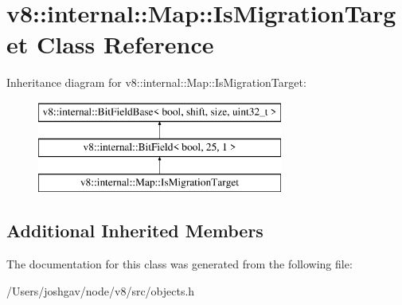 \hypertarget{classv8_1_1internal_1_1_map_1_1_is_migration_target}{}\section{v8\+:\+:internal\+:\+:Map\+:\+:Is\+Migration\+Target Class Reference}
\label{classv8_1_1internal_1_1_map_1_1_is_migration_target}
Inheritance diagram for v8\+:\+:internal\+:\+:Map\+:\+:Is\+Migration\+Target\+:\begin{figure}[H]
\begin{center}
\leavevmode
\includegraphics[height=3.000000cm]{classv8_1_1internal_1_1_map_1_1_is_migration_target}
\end{center}
\end{figure}
\subsection*{Additional Inherited Members}


The documentation for this class was generated from the following file\+:\begin{DoxyCompactItemize}
\item 
/\+Users/joshgav/node/v8/src/objects.\+h\end{DoxyCompactItemize}
